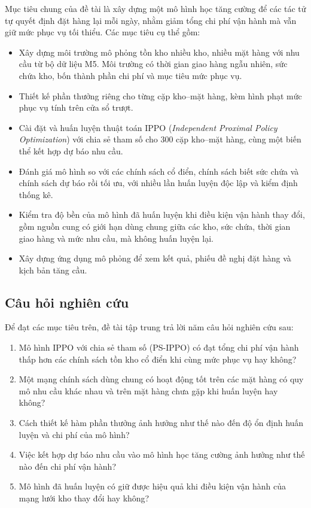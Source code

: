 Mục tiêu chung của đề tài là xây dựng một mô hình học tăng cường để các tác tử tự quyết định đặt hàng lại mỗi ngày, nhằm giảm tổng chi phí vận hành mà vẫn giữ mức phục vụ tối thiểu. Các mục tiêu cụ thể gồm:
\begin{itemize}
    \item Xây dựng môi trường mô phỏng tồn kho nhiều kho, nhiều mặt hàng với nhu cầu từ bộ dữ liệu M5. Môi trường có thời gian giao hàng ngẫu nhiên, sức chứa kho, bốn thành phần chi phí và mục tiêu mức phục vụ.
    \item Thiết kế phần thưởng riêng cho từng cặp kho--mặt hàng, kèm hình phạt mức phục vụ tính trên cửa sổ trượt.
    \item Cài đặt và huấn luyện thuật toán IPPO (\textit{Independent Proximal Policy Optimization}) với chia sẻ tham số cho 300 cặp kho--mặt hàng, cùng một biến thể kết hợp dự báo nhu cầu.
    \item Đánh giá mô hình so với các chính sách cổ điển, chính sách biết sức chứa và chính sách dự báo rồi tối ưu, với nhiều lần huấn luyện độc lập và kiểm định thống kê.
    \item Kiểm tra độ bền của mô hình đã huấn luyện khi điều kiện vận hành thay đổi, gồm nguồn cung có giới hạn dùng chung giữa các kho, sức chứa, thời gian giao hàng và mức nhu cầu, mà không huấn luyện lại.
    \item Xây dựng ứng dụng mô phỏng để xem kết quả, phiếu đề nghị đặt hàng và kịch bản tăng cầu.
\end{itemize}

\subsection{Câu hỏi nghiên cứu}
\label{subsec:cauhoi}

Để đạt các mục tiêu trên, đề tài tập trung trả lời năm câu hỏi nghiên cứu sau:
\begin{enumerate}[label=Câu hỏi \arabic*:, leftmargin=*, align=left]
    \item Mô hình IPPO với chia sẻ tham số (PS-IPPO) có đạt tổng chi phí vận hành thấp hơn các chính sách tồn kho cổ điển khi cùng mức phục vụ hay không?
    \item Một mạng chính sách dùng chung có hoạt động tốt trên các mặt hàng có quy mô nhu cầu khác nhau và trên mặt hàng chưa gặp khi huấn luyện hay không?
    \item Cách thiết kế hàm phần thưởng ảnh hưởng như thế nào đến độ ổn định huấn luyện và chi phí của mô hình?
    \item Việc kết hợp dự báo nhu cầu vào mô hình học tăng cường ảnh hưởng như thế nào đến chi phí vận hành?
    \item Mô hình đã huấn luyện có giữ được hiệu quả khi điều kiện vận hành của mạng lưới kho thay đổi hay không?
\end{enumerate}


